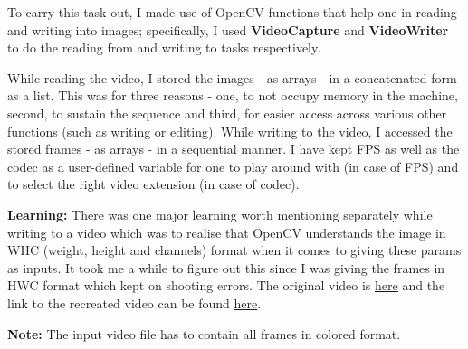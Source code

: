 \documentclass[notitlepage]{report}
\begin{document}
To carry this task out, I made use of OpenCV functions that help one in reading and writing into images; specifically, I used \textbf{VideoCapture} and
\textbf{VideoWriter} to do the reading from and writing to tasks respectively.

While reading the video, I stored the images - as arrays - in a concatenated form as a list. This was for three reasons - one, to not occupy memory
in the machine, second, to sustain the sequence and third, for easier access across various other functions (such as writing or editing).
While writing to the video, I accessed the stored frames - as arrays - in a sequential manner. I have kept FPS as well as the codec as a user-defined variable 
for one to play around with (in case of FPS) and to select the right video extension (in case of codec). 

\textbf{Learning:} There was one major learning worth mentioning separately while writing to a video which was to realise that OpenCV
understands the image in WHC (weight, height and channels) format when it comes to giving these params as inputs. It took me a while to 
figure out this since I was giving the frames in HWC format which kept on shooting errors. The original video is 
\href{https://iiitaphyd-my.sharepoint.com/:v:/g/personal/soham_vaishnav_research_iiit_ac_in/Ec_j7y3V879EngubQkT_wU4BXeToZQwFjUkFBHgawnIIsA?nav=eyJyZWZlcnJhbEluZm8iOnsicmVmZXJyYWxBcHAiOiJPbmVEcml2ZUZvckJ1c2luZXNzIiwicmVmZXJyYWxBcHBQbGF0Zm9ybSI6IldlYiIsInJlZmVycmFsTW9kZSI6InZpZXciLCJyZWZlcnJhbFZpZXciOiJNeUZpbGVzTGlua0NvcHkifX0&e=qzGjbD}{here}
and the link to the recreated video can be found 
\href{https://iiitaphyd-my.sharepoint.com/:v:/g/personal/soham_vaishnav_research_iiit_ac_in/EY-A4Kj5dd9Kqraze4W-jf0BFBeDbjO1vpnLBdHrQsBkiA?nav=eyJyZWZlcnJhbEluZm8iOnsicmVmZXJyYWxBcHAiOiJPbmVEcml2ZUZvckJ1c2luZXNzIiwicmVmZXJyYWxBcHBQbGF0Zm9ybSI6IldlYiIsInJlZmVycmFsTW9kZSI6InZpZXciLCJyZWZlcnJhbFZpZXciOiJNeUZpbGVzTGlua0NvcHkifX0&e=RPeIJL}{here}.

\textbf{Note:} The input video file has to contain all frames in colored format.
\end{document}
